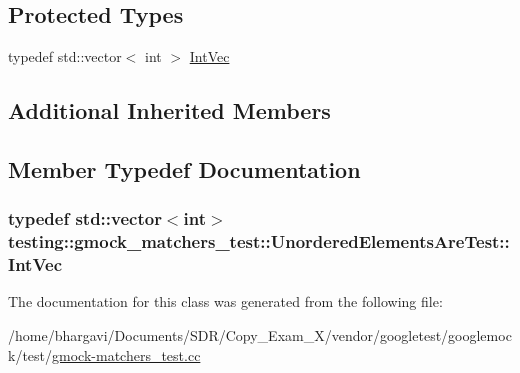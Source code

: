 \subsection*{Protected Types}
\begin{DoxyCompactItemize}
\item 
typedef std\+::vector$<$ int $>$ \hyperlink{classtesting_1_1gmock__matchers__test_1_1_unordered_elements_are_test_a608750c71652943bd11fe7bb5281588d}{Int\+Vec}
\end{DoxyCompactItemize}
\subsection*{Additional Inherited Members}


\subsection{Member Typedef Documentation}
\subsubsection[{\texorpdfstring{Int\+Vec}{IntVec}}]{\setlength{\rightskip}{0pt plus 5cm}typedef std\+::vector$<$int$>$ {\bf testing\+::gmock\+\_\+matchers\+\_\+test\+::\+Unordered\+Elements\+Are\+Test\+::\+Int\+Vec}\hspace{0.3cm}{\ttfamily [protected]}}\hypertarget{classtesting_1_1gmock__matchers__test_1_1_unordered_elements_are_test_a608750c71652943bd11fe7bb5281588d}{}\label{classtesting_1_1gmock__matchers__test_1_1_unordered_elements_are_test_a608750c71652943bd11fe7bb5281588d}


The documentation for this class was generated from the following file\+:\begin{DoxyCompactItemize}
\item 
/home/bhargavi/\+Documents/\+S\+D\+R/\+Copy\+\_\+\+Exam\+\_\+X/vendor/googletest/googlemock/test/\hyperlink{gmock-matchers__test_8cc}{gmock-\/matchers\+\_\+test.\+cc}\end{DoxyCompactItemize}
